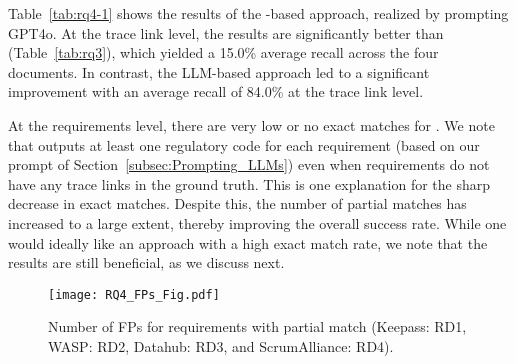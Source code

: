 


% 

 Table~\ref{tab:rq4-1} shows the results of the \RICE-based approach, realized by prompting GPT4o. %
At the trace link level, the results are significantly better than \kashif  (Table~\ref{tab:rq3}), which yielded a 15.0\% average recall across the four documents. In contrast, the LLM-based approach led to a significant improvement with an average recall of 84.0\% at the trace link level.



At the requirements level, there are very low or no exact matches for \RICE. We note that \RICE outputs at least one regulatory code for each requirement (based on our prompt of Section~\ref{subsec:Prompting_LLMs}) even when requirements do not have any trace links in the ground truth. This is one explanation for the sharp decrease in exact matches. Despite this, the number of partial matches has increased to a large extent, thereby improving the overall success rate. While one would ideally like an approach with a high exact match rate, we note that the results are still beneficial, as we discuss next. 



\begin{figure}[!tbh]
\texttt{[image: RQ4\_FPs\_Fig.pdf]}
  \caption{Number of FPs for requirements with partial match (Keepass: RD1, WASP: RD2, Datahub: RD3, and ScrumAlliance: RD4).}
  \label{fig:RQ4_FPsAnalysis}
\end{figure}

